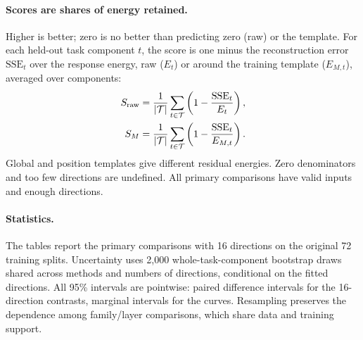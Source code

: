 \paragraph{Scores are shares of energy retained.}
Higher is better; zero is no better than predicting zero (raw) or the template. For each held-out task component $t$, the score is one minus the reconstruction error $\mathrm{SSE}_t$ over the response energy, raw ($E_t$) or around the training template ($E_{M,t}$), averaged over components:
\begin{align}
 S_{\rm raw}&=\frac{1}{|\mathcal T|}\sum_{t\in\mathcal T}
 \left(1-\frac{\mathrm{SSE}_t}{E_t}\right),\\
 S_M&=\frac{1}{|\mathcal T|}\sum_{t\in\mathcal T}
 \left(1-\frac{\mathrm{SSE}_t}{E_{M,t}}\right).
\end{align}
Global and position templates give different residual energies. Zero denominators and too few directions are undefined. All primary comparisons have valid inputs and enough directions.

\paragraph{Statistics.}
The tables report the primary comparisons with 16 directions on the original 72 training splits. Uncertainty uses 2,000 whole-task-component bootstrap draws shared across methods and numbers of directions, conditional on the fitted directions. All 95\% intervals are pointwise: paired difference intervals for the 16-direction contrasts, marginal intervals for the curves. Resampling preserves the dependence among family/layer comparisons, which share data and training support.

